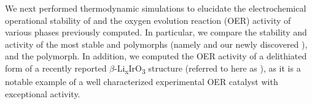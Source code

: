 %



%
%
We next performed  thermodynamic simulations to elucidate the electrochemical operational stability of \IrOx and the oxygen evolution reaction (OER) activity of various \IrOthree phases previously computed.
%
In particular, we compare the stability and activity of the most stable \IrOtwo and \IrOthree polymorphs
(namely \rIrOtwo and our newly discovered \aIrOthree),
and the \rIrOthree polymorph.
%
In addition, we computed the OER activity of a delithiated form of a recently reported $\beta$-Li\textsubscript{x}IrO\textsubscript{3} structure
(referred to here as \bIrOthree),
as it is a notable example of a well characterized experimental \IrOthree OER catalyst with exceptional activity.
\cite{Pearce2017,Pearce2019}


